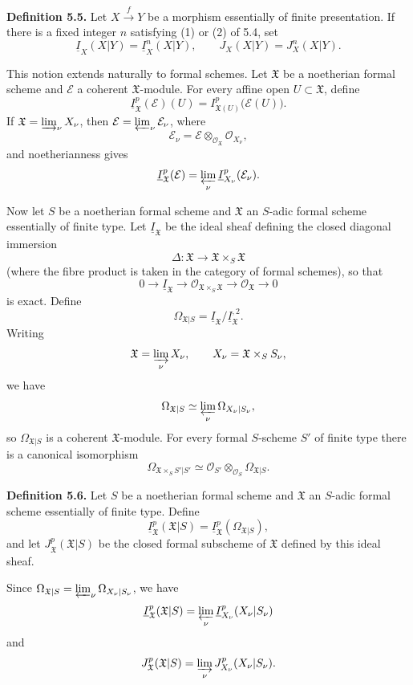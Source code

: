 \medskip
\noindent\textbf{Definition 5.5.}
Let $X\xrightarrow{f}Y$ be a morphism essentially of finite
presentation. If there is a fixed integer $n$ satisfying (1) or (2)
of 5.4, set
\[
\underline I_X(X|Y)=\underline I_X^n(X|Y),
\qquad
J_X(X|Y)=J_X^n(X|Y).
\]


This notion extends naturally to formal schemes. Let $\mathfrak X$
be a noetherian formal scheme and $\mathcal E$ a coherent
$\mathfrak X$-module. For every affine open $U\subset\mathfrak X$,
define
\[
\underline I_{\mathfrak X}^p(\mathcal E)(U)
=I_{\mathfrak X(U)}^p\bigl(\mathcal E(U)\bigr).
\]
If $\mathfrak X=\varinjlim_\nu X_\nu$, then
$\mathcal E=\varprojlim_\nu\mathcal E_\nu$, where
\[
\mathcal E_\nu
=\mathcal E\otimes_{\mathcal O_{\mathfrak X}}\mathcal O_{X_\nu},
\]
and noetherianness gives
\[
\underline I_{\mathfrak X}^p(\mathcal E)
=\varprojlim_\nu\underline I_{X_\nu}^p(\mathcal E_\nu).
\]

Now let $S$ be a noetherian formal scheme and $\mathfrak X$ an
$S$-adic formal scheme essentially of finite type. Let
$\underline I_{\mathfrak X}$ be the ideal sheaf defining the closed
diagonal immersion
\[
\Delta:\mathfrak X\longrightarrow
\mathfrak X\times_S\mathfrak X
\]
(where the fibre product is taken in the category of formal schemes),
so that
\[
0\longrightarrow\underline I_{\mathfrak X}
\longrightarrow\mathcal O_{\mathfrak X\times_S\mathfrak X}
\longrightarrow\mathcal O_{\mathfrak X}\longrightarrow0
\]
is exact. Define
\[
\Omega_{\mathfrak X|S}
=\underline I_{\mathfrak X}/\underline I_{\mathfrak X}^{,2}.
\]
Writing
\[
\mathfrak X=\varinjlim_\nu X_\nu,
\qquad X_\nu=\mathfrak X\times_SS_\nu,
\]
we have
\[
\Omega_{\mathfrak X|S}
\simeq\varprojlim_\nu\Omega_{X_\nu|S_\nu},
\]
so $\Omega_{\mathfrak X|S}$ is a coherent $\mathfrak X$-module.
For every formal $S$-scheme $S'$ of finite type there is a canonical
isomorphism
\[
\Omega_{\mathfrak X\times_SS'|S'}
\simeq
\mathcal O_{S'}\otimes_{\mathcal O_S}\Omega_{\mathfrak X|S}.
\]

\medskip
\noindent\textbf{Definition 5.6.}
Let $S$ be a noetherian formal scheme and $\mathfrak X$ an $S$-adic
formal scheme essentially of finite type. Define
\[
\underline I_{\mathfrak X}^p(\mathfrak X|S)
=\underline I_{\mathfrak X}^p(\Omega_{\mathfrak X|S}),
\]
and let $J_{\mathfrak X}^p(\mathfrak X|S)$ be the closed formal
subscheme of $\mathfrak X$ defined by this ideal sheaf.

Since
$\Omega_{\mathfrak X|S}=\varprojlim_\nu\Omega_{X_\nu|S_\nu}$,
we have
\[
\underline I_{\mathfrak X}^p(\mathfrak X|S)
=\varprojlim_\nu\underline I_{X_\nu}^p(X_\nu|S_\nu)
\]
and
\[
J_{\mathfrak X}^p(\mathfrak X|S)
=\varinjlim_\nu J_{X_\nu}^p(X_\nu|S_\nu).
\]

